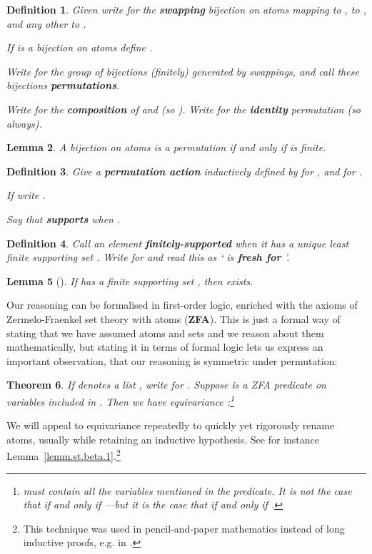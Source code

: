 \documentclass[submission,copyright]{eptcs}
\newtheorem{thrm}{Theorem}[section]
\newtheorem{lemm}[thrm]{Lemma}
\newtheorem{defn}[thrm]{Definition}
\newcommand{\deffont}[1]{\textbf{#1}}
\begin{document}
\begin{defn}
\label{defn.swap}
\label{def.permutation}
\label{def.nontriv}
Given  write  for the \deffont{swapping} bijection on atoms mapping  to ,  to , and any other  to .

If  is a bijection on atoms define .
 
Write  for the group of bijections (finitely) generated by swappings, and call these bijections \deffont{permutations}.

Write  for the \deffont{composition} of  and  (so ).
Write  for the \deffont{identity} permutation (so  always). 
\end{defn}

\begin{lemm}
\label{lemm.basic.property.of.permutations}
A bijection  on atoms is a permutation if and only if  is finite.
\end{lemm}


\begin{defn}
\label{defn.perm}
Give  a \deffont{permutation action}  inductively defined by  for , and
 for .

If  write .


Say that  \deffont{supports}  when .
\end{defn}

\begin{defn}
Call an element  \deffont{finitely-supported} when it has a unique least finite supporting set .
Write  for  and read this as ` is \deffont{fresh for} '.
\end{defn}

\begin{lemm}[\cite{gabbay:newaas-jv,gabbay:fountl}]
If  has a finite supporting set , then  exists.
\end{lemm} 






Our reasoning can be formalised in first-order logic, enriched with the axioms of Zermelo-Fraenkel set theory with atoms (\deffont{ZFA}).
This is just a formal way of stating that we have assumed atoms and sets and we reason about them mathematically, but stating it in terms of formal logic lets us express an important observation, that our reasoning is symmetric under permutation: 
\begin{thrm}
\label{thrm.equivar}
If  denotes a list , write
 for .
Suppose  is a ZFA predicate on variables included in .
Then we have \emph{equivariance} \cite[Section~4]{gabbay:fountl}:\footnote{ must contain \emph{all} the variables mentioned in the predicate.
It is not the case that  if and only if ---but it is the case that  if and only if .} 

\end{thrm}
We will appeal to equivariance repeatedly to quickly yet rigorously rename atoms, usually while retaining an inductive hypothesis.
See for instance Lemma~\ref{lemm.st.beta.1}.\footnote{This technique was used in pencil-and-paper mathematics instead of long inductive proofs, e.g. in \cite{gabbay:frelog}.}
\end{document}
